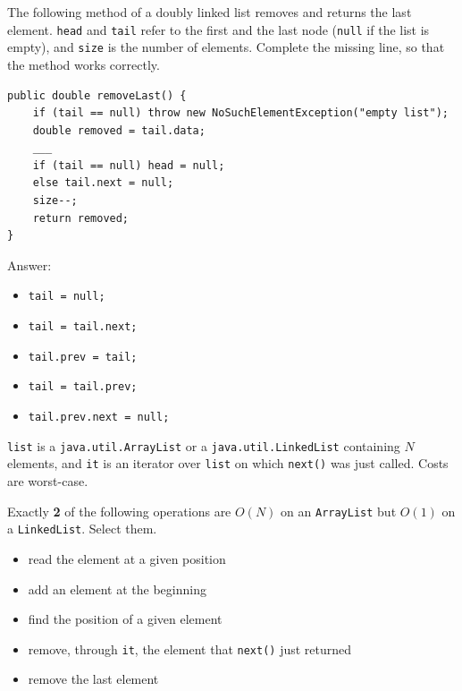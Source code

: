 \begin{question}
The following method of a doubly linked list removes and returns the last element.
\lstinline|head| and \lstinline|tail| refer to the first and the last node (\lstinline|null| if the list is empty), and \lstinline|size| is the number of elements.
Complete the missing line, so that the method works correctly.

\begin{lstlisting}
public double removeLast() {
    if (tail == null) throw new NoSuchElementException("empty list");
    double removed = tail.data;
    ___
    if (tail == null) head = null;
    else tail.next = null;
    size--;
    return removed;
}
\end{lstlisting}

Answer:
\begin{itemize}[leftmargin=2em,itemsep=1pt,topsep=2pt]
\item[\cb{0}] \lstinline|tail = null;|
\item[\cb{0}] \lstinline|tail = tail.next;|
\item[\cb{0}] \lstinline|tail.prev = tail;|
\item[\cb{1}] \lstinline|tail = tail.prev;|
\item[\cb{0}] \lstinline|tail.prev.next = null;|
\end{itemize}
\end{question}

\begin{question}
\lstinline|list| is a \lstinline|java.util.ArrayList| or a \lstinline|java.util.LinkedList| containing $N$ elements, and \lstinline|it| is an iterator over \lstinline|list| on which \lstinline|next()| was just called.
Costs are worst-case.

Exactly \textbf{2} of the following operations are $O(N)$ on an \lstinline|ArrayList| but $O(1)$ on a \lstinline|LinkedList|. Select them.
\begin{itemize}[leftmargin=2em,itemsep=1pt,topsep=2pt]
\item[\cb{0}] read the element at a given position
\item[\cb{1}] add an element at the beginning
\item[\cb{0}] find the position of a given element
\item[\cb{1}] remove, through \lstinline|it|, the element that \lstinline|next()| just returned
\item[\cb{0}] remove the last element
\end{itemize}
\end{question}


